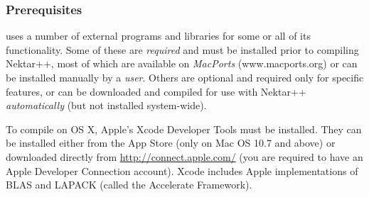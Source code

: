 \subsubsection{Prerequisites}
\nekpp uses a number of external programs and libraries for some or all of its
functionality. Some of these are \emph{required} and must be installed prior to
compiling Nektar++, most of which are available on \emph{MacPorts}
(www.macports.org) or can be installed manually by a \emph{user}. Others are
optional and required only for specific features, or can be downloaded and 
compiled for use with Nektar++ \emph{automatically} (but not installed
system-wide).

\begin{notebox}
  To compile \nekpp on OS X, Apple's Xcode Developer Tools must be
  installed. They can be installed either from the App Store (only on Mac OS
  10.7 and above) or downloaded directly from
  \href{http://connect.apple.com/}{http://connect.apple.com/} (you are required
  to have an Apple Developer Connection account).  Xcode includes Apple
  implementations of BLAS and LAPACK (called the Accelerate Framework).
\end{notebox}

